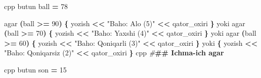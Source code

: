 \documentclass[a4paper,11pt,twoside,openright]{book}
\newenvironment{Shaded}{\begin{snugshade}}{\end{snugshade}}
\newcommand{\DecValTok}[1]{\textcolor[rgb]{0.00,0.00,0.81}{#1}}
\newcommand{\ErrorTok}[1]{\textcolor[rgb]{0.64,0.00,0.00}{\textbf{#1}}}
\newcommand{\NormalTok}[1]{#1}
\newcommand{\OperatorTok}[1]{\textcolor[rgb]{0.81,0.36,0.00}{\textbf{#1}}}
\newcommand{\PreprocessorTok}[1]{\textcolor[rgb]{0.56,0.35,0.01}{\textit{#1}}}
\newcommand{\StringTok}[1]{\textcolor[rgb]{0.31,0.60,0.02}{#1}}
\begin{document}
\begin{Shaded}
\begin{Highlighting}[]
\ErrorTok{\textasciigrave{}\textasciigrave{}\textasciigrave{}}\NormalTok{cpp}
\NormalTok{butun ball }\OperatorTok{=} \DecValTok{78}

\NormalTok{agar }\OperatorTok{(}\NormalTok{ball }\OperatorTok{\textgreater{}=} \DecValTok{90}\OperatorTok{)} \OperatorTok{\{}
\NormalTok{    yozish }\OperatorTok{\textless{}\textless{}} \StringTok{"Baho: A\textquotesingle{}lo (5)"} \OperatorTok{\textless{}\textless{}}\NormalTok{ qator\_oxiri}
\OperatorTok{\}}\NormalTok{ yoki agar }\OperatorTok{(}\NormalTok{ball }\OperatorTok{\textgreater{}=} \DecValTok{70}\OperatorTok{)} \OperatorTok{\{}
\NormalTok{    yozish }\OperatorTok{\textless{}\textless{}} \StringTok{"Baho: Yaxshi (4)"} \OperatorTok{\textless{}\textless{}}\NormalTok{ qator\_oxiri}
\OperatorTok{\}}\NormalTok{ yoki agar }\OperatorTok{(}\NormalTok{ball }\OperatorTok{\textgreater{}=} \DecValTok{60}\OperatorTok{)} \OperatorTok{\{}
\NormalTok{    yozish }\OperatorTok{\textless{}\textless{}} \StringTok{"Baho: Qoniqarli (3)"} \OperatorTok{\textless{}\textless{}}\NormalTok{ qator\_oxiri}
\OperatorTok{\}}\NormalTok{ yoki }\OperatorTok{\{}
\NormalTok{    yozish }\OperatorTok{\textless{}\textless{}} \StringTok{"Baho: Qoniqarsiz (2)"} \OperatorTok{\textless{}\textless{}}\NormalTok{ qator\_oxiri}
\OperatorTok{\}}
\ErrorTok{\textasciigrave{}\textasciigrave{}\textasciigrave{}}\NormalTok{cpp}
\PreprocessorTok{\#}\ErrorTok{\#\# Ichma{-}ich \textasciigrave{}agar\textasciigrave{}}

\ErrorTok{\textasciigrave{}\textasciigrave{}\textasciigrave{}}\NormalTok{cpp}
\NormalTok{butun son }\OperatorTok{=} \DecValTok{15}


\end{Highlighting}
\end{Shaded}
\end{document}
